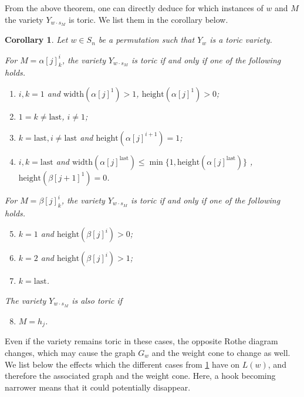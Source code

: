\documentclass[11pt]{amsart}
\newtheorem{corollary}[theorem]{Corollary}
\theoremstyle{definition}
\theoremstyle{definition}
\theoremstyle{definition}
\theoremstyle{definition}
\begin{document}
From the above theorem, one can directly deduce for which instances of $w$ and $M$ the variety $Y_{w \cdot s_M}$ is toric. We list them in the corollary below. 

\begin{corollary}\label{cor: toric cases}
Let $w\in S_n$ be a permutation such that $Y_w$ is a toric variety. 

For $M= \alpha[j]^i_k$, the variety $Y_{w\cdot s_M}$ is toric if and only if one of the following holds.
\begin{enumerate}
    \item $i,k=1$ and $\mathrm{width}(\alpha[j]^1)>1$,
        $\mathrm{height}(\alpha[j]^1)>0$; 
    \item $1 = k \neq \mathrm{last}$, $i \neq 1$;
    \item $k = \mathrm{last}, i \neq \mathrm{last}$ and $\mathrm{height}(\alpha[j]^{i+1})=1$;
    \item $i,k= \mathrm{last}$ and
    {$\mathrm{width}(\alpha[j]^{\mathrm{last}}) \leq \min \{1, \mathrm{height}(\alpha[j]^{\mathrm{last}}) \}$}
    , $\mathrm{height}(\beta[j+1]^1)=0$.
\end{enumerate}
For $M= \beta[j]^i_k$, the variety $Y_{w\cdot s_M}$ is toric if and only if one of the following holds.
\begin{enumerate}
    \setcounter{enumi}{4}
    \item $k=1$ and $\mathrm{height}(\beta[j]^i)>0$;
    \item $k=2$ and $\mathrm{height}(\beta[j]^i)>1$;
    \item $k = \mathrm{last}$.
\end{enumerate}

The variety $Y_{w\cdot s_M}$ is also toric if

\begin{enumerate}
    \setcounter{enumi}{7}
    \item $M=h_j$.
\end{enumerate}

\end{corollary}

Even if the variety remains toric in these cases, the opposite Rothe diagram changes, which may cause the graph $G_w$ and the weight cone to change as well. We list below the effects which the different cases from \ref{cor: toric cases} have on $L(w)$, and therefore the associated graph and the weight cone. Here, a hook becoming narrower means that it could potentially disappear.
\end{document}
